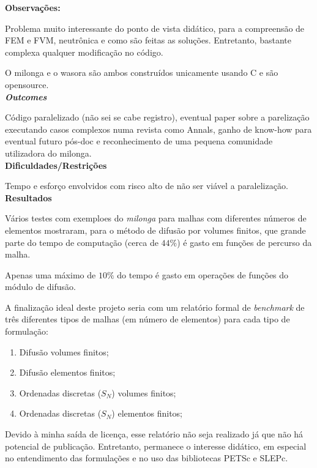 \textbf{Observações:}

Problema muito interessante do ponto de vista didático, para a compreensão 
de FEM e FVM, neutrônica e como são feitas as soluções. Entretanto, bastante 
complexa qualquer modificação no código.

O milonga e o wasora são ambos construídos unicamente usando C e são opensource.\\

\textbf{\textit{Outcomes}}

Código paralelizado (não sei se cabe registro), eventual paper sobre a parelização 
executando casos complexos numa revista como Annals, ganho de know-how para eventual futuro pós-doc e reconhecimento de uma pequena comunidade utilizadora 
do milonga.\\

\textbf{Dificuldades/Restrições}

Tempo e esforço envolvidos com risco alto de não ser viável a paralelização.\\

\textbf{Resultados}

Vários testes com exemploes do \textit{milonga} para malhas com diferentes números de elementos mostraram, para o método de difusão por volumes finitos, que grande parte 
do tempo de computação (cerca de $44\%$) é gasto em funções de percurso da malha.

Apenas uma máximo de $10\%$ do tempo é gasto em operações de funções do módulo 
de difusão. 

A finalização ideal deste projeto seria com um relatório formal de \textit{benchmark} de três diferentes tipos de malhas (em número de elementos) 
para cada tipo de formulação:

\begin{enumerate}
\item Difusão volumes finitos;
\item Difusão elementos finitos;
\item Ordenadas discretas ($S_N$) volumes finitos;
\item Ordenadas discretas ($S_N$) elementos finitos;
\end{enumerate}

Devido à minha saída de licença, esse relatório não seja realizado já que não há 
potencial de publicação. Entretanto, permanece o interesse didático, em especial no entendimento das formulações e no uso das bibliotecas PETSc e SLEPc.